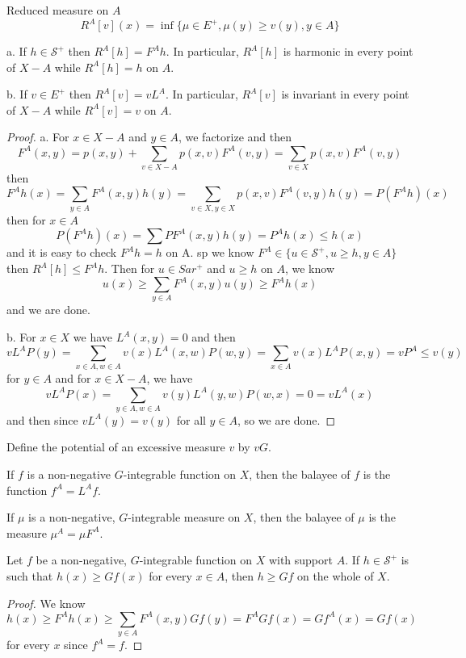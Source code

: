 \documentclass[lang=en, color=blue, ]{elegantbook}
\newcommand{\Sar}{\mathcal{S}}
\begin{document}
\begin{definition}
    Reduced measure on $A$
    \[R^A[v] (x) = \inf\{\mu\in E^+, \mu(y)\geq v(y), y\in A\}\]
\end{definition}
\begin{theorem}
    a. If $h\in \Sar^+$ then $R^A[h] = F^Ah$. In particular, $R^A[h]$ is harmonic in every point of $X-A$ while $R^A[h] = h$ on $A$.\par
    b. If $v\in E^+$ then $R^A[v] = vL^A$. In particular, $R^A[v]$ is invariant in every point of $X-A$ while $R^A[v] = v$ on $A$.
\end{theorem}
\begin{proof}
    a. For $x\in X-A$ and $y\in A$, we factorize and then
    \[
    F^A(x,y) = p(x,y) + \sum\limits_{v\in X-A} p(x,v)F^A(v,y) = \sum_{v\in X} p(x,v)F^A(v,y)
    \]
    then
    \[
    F^Ah(x) = \sum\limits_{y\in A}F^A(x,y)h(y) = \sum\limits_{v\in X,y\in X} p(x,v)F^A(v,y)h(y) = P(F^A h)(x)
    \]
    then for $x\in A$
    \[
    P(F^Ah)(x) = \sum PF^A(x,y)h(y) = P^Ah(x) \leq h(x)
    \]
    and it is easy to check $F^Ah = h$ on A. sp we know $F^A \in \{u\in \Sar^+, u\geq h, y\in A\}$ then $R^A[h] \leq F^A h$. Then for $u \in Sar^+$ and $u\geq h$ on $A$, we know
    \[
    u(x) \geq \sum_{y\in A}F^A(x,y)u(y) \geq F^Ah(x)
    \]
    and we are done.\par
    b. For $x\in X$ we have $L^A(x,y) = 0$ and then
    \[
    vL^AP(y) = \sum\limits_{x\in A,w\in A}v(x)L^A(x,w)P(w,y) = \sum\limits_{x\in A}v(x)L^AP(x,y) = vP^A \leq v(y)
    \]
    for $y \in A$ and for $x\in X-A$, we have
    \[
    vL^AP(x) = \sum\limits_{y\in A,w\in A}v(y)L^A(y,w)P(w,x) = 0 = vL^A(x)
    \]
    and then since $vL^A(y) = v(y)$ for all $y\in A$, so we are done.\par
\end{proof}

\begin{definition}
    Define the potential of an excessive measure $v$ by $vG$.\par
    If $f$ is a non-negative $G$-integrable function on $X$, then the balayee of $f$ is the function $f^A = L^Af$.\par
    If $\mu$ is a non-negative, $G$-integrable measure on $X$, then the balayee of $\mu$ is the measure $\mu^A = \mu F^A$.
\end{definition}
\begin{theorem}
    Let $f$ be a non-negative, $G$-integrable function on $X$ with support $A$. If $h\in \Sar^+$ is such that $h(x) \geq Gf(x)$ for every $x\in A$, then $h\geq Gf$ on the whole of $X$.
\end{theorem}
\begin{proof}
    We know
    \[
    h(x) \geq F^Ah(x) \geq \sum\limits_{y\in A}F^A(x,y)Gf(y) = F^AGf(x) = Gf^A(x) = Gf(x) 
    \]
    for every $x$ since $f^A = f$.
\end{proof}
\end{document}
